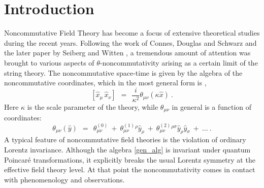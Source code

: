 \documentclass[prl,tightenlines]{revtex4}
\begin{document}
\maketitle

\section{Introduction}

Noncommutative Field Theory has become a focus of extensive theoretical studies during the 
recent years.
Following the work of Connes, Douglas and Schwarz \cite{Connes:1997cr} and the later paper
by Seiberg and Witten \cite{Seiberg:1999vs}, a tremendous amount of attention
was brought to various aspects of $ \theta $-noncommutativity arising 
as a certain limit of the string theory. 
The noncommutative space-time is given by the algebra of the noncommutative coordinates, which in the most
general form is \cite{Lukierski:2005fc},
\begin{equation}
\label{gen_alg}
	[ \hat{x}_\mu \, \hat{x}_\nu ] ~~=~~ \frac i {\kappa^2} \theta_{\mu\nu} (\kappa \hat{x})~.
\end{equation}
Here $ \kappa $ is the scale parameter of the theory, while $ \theta_{\mu\nu} $ in general is a function
of coordinates:
\begin{equation}
\label{theta_series}
	\theta_{\mu\nu}(\hat{y}) ~~=~~ \theta_{\mu\nu}^{(0)} ~+~ \theta_{\mu\nu}^{(1)}{}^{\rho}\hat{y}_\rho ~+~
					\theta_{\mu\nu}^{(2)}{}^{\rho\sigma}\hat{y}_\rho\hat{y}_\sigma ~+~ \dots~.
\end{equation}
A typical feature of noncommutative field theories is the violation of ordinary Lorentz invariance.
Although the algebra \eqref{gen_alg} is invariant under quantum Poincar\'{e} transformations, it explicitly
breaks the usual Lorentz symmetry at the effective field theory level. 
At that point the noncommutativity comes in contact with phenomenology and observations. 
\end{document}
